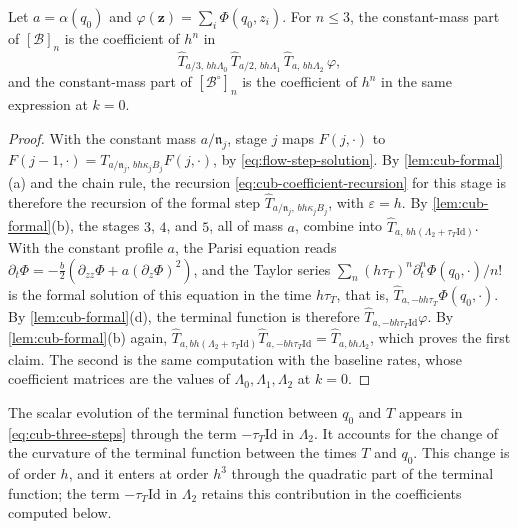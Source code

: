 \begin{lemma}\label{lem:cub-three-steps}
Let $a=\alpha(q_0)$ and $\varphi(\mathbf z)=\sum_i\Phi(q_0,z_i)$. For $n\le3$,
the constant-mass part of $[\mathcal B]_n$ is the coefficient of $h^n$ in
\begin{equation}\label{eq:cub-three-steps}
 \widehat T_{a/3,\,bh\Lambda_0}\,\widehat T_{a/2,\,bh\Lambda_1}\,
 \widehat T_{a,\,bh\Lambda_2}\,\varphi,
\end{equation}
and the constant-mass part of $[\mathcal B^\circ]_n$ is the coefficient of $h^n$
in the same expression at $k=0$.
\end{lemma}

\begin{proof}
With the constant mass $a/\mathfrak n_j$, stage $j$ maps $F(j,\cdot)$ to
$F(j-1,\cdot)=T_{a/\mathfrak n_j,\,bh\kappa_jB_j}F(j,\cdot)$, by
\eqref{eq:flow-step-solution}. By \cref{lem:cub-formal}(a) and the chain rule,
the recursion \eqref{eq:cub-coefficient-recursion} for this stage is therefore
the recursion of the formal step $\widehat T_{a/\mathfrak n_j,\,bh\kappa_jB_j}$, with
$\varepsilon=h$. By \cref{lem:cub-formal}(b), the stages
$3$, $4$, and $5$, all of mass $a$, combine into
$\widehat T_{a,\,bh(\Lambda_2+\tau_T\mathrm{Id})}$. With the constant profile $a$, the
Parisi equation reads $\partial_t\Phi=-\frac b2(\partial_{zz}\Phi
+a(\partial_z\Phi)^2)$, and the Taylor series
$\sum_n(h\tau_T)^n\partial_t^n\Phi(q_0,\cdot)/n!$ is the formal solution of
this equation in the time $h\tau_T$, that is,
$\widehat T_{a,-bh\tau_T}\Phi(q_0,\cdot)$. By \cref{lem:cub-formal}(d), the
terminal function is therefore $\widehat T_{a,-bh\tau_T\mathrm{Id}}\varphi$. By
\cref{lem:cub-formal}(b) again,
$\widehat T_{a,bh(\Lambda_2+\tau_T\mathrm{Id})}\widehat T_{a,-bh\tau_T\mathrm{Id}}=\widehat
T_{a,bh\Lambda_2}$, which proves the first claim. The second is the same
computation with the baseline rates, whose coefficient matrices are the values of
$\Lambda_0,\Lambda_1,\Lambda_2$ at $k=0$.
\end{proof}

The scalar evolution of the terminal function between $q_0$ and $T$ appears in
\eqref{eq:cub-three-steps} through the term $-\tau_T\mathrm{Id}$ in $\Lambda_2$. It
accounts for the change of the curvature of the terminal function between the
times $T$ and $q_0$. This change is of order $h$, and it enters at order $h^3$
through the quadratic part of the terminal function; the term $-\tau_T\mathrm{Id}$ in $\Lambda_2$ retains this contribution in the coefficients computed below.

